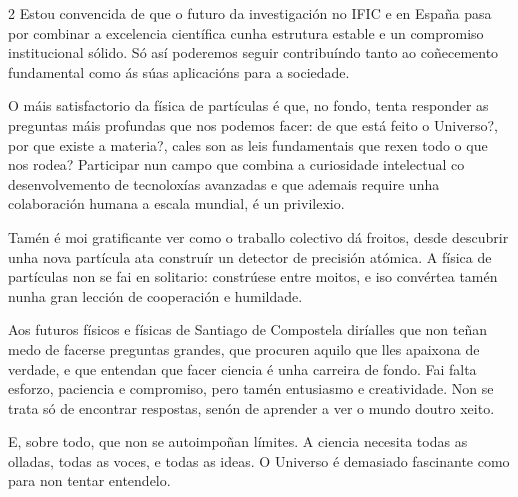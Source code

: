 \begin{multicols}{2}
Estou convencida de que o futuro da investigación no IFIC e en España pasa por
combinar a excelencia científica cunha estrutura estable e un compromiso
institucional sólido. Só así poderemos seguir contribuíndo tanto ao coñecemento
fundamental como ás súas aplicacións para a sociedade.


O máis satisfactorio da física de partículas é que, no fondo, tenta responder
as preguntas máis profundas que nos podemos facer: de que está feito o
Universo?, por que existe a materia?, cales son as leis fundamentais que rexen
todo o que nos rodea? Participar nun campo que combina a curiosidade
intelectual co desenvolvemento de tecnoloxías avanzadas e que ademais require
unha colaboración humana a escala mundial, é un privilexio.

Tamén é moi gratificante ver como o traballo colectivo dá froitos, desde
descubrir unha nova partícula ata construír un detector de precisión atómica. A
física de partículas non se fai en solitario: constrúese entre moitos, e iso
convértea tamén nunha gran lección de cooperación e humildade.

Aos futuros físicos e físicas de Santiago de Compostela diríalles que non teñan
medo de facerse preguntas grandes, que procuren aquilo que lles apaixona de
verdade, e que entendan que facer ciencia é unha carreira de fondo. Fai falta
esforzo, paciencia e compromiso, pero tamén entusiasmo e creatividade. Non se
trata só de encontrar respostas, senón de aprender a ver o mundo doutro xeito.

E, sobre todo, que non se autoimpoñan límites. A ciencia necesita todas as
olladas, todas as voces, e todas as ideas. O Universo é demasiado fascinante
como para non tentar entendelo.

\end{multicols}
